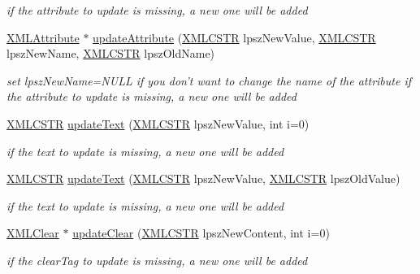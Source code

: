 \begin{DoxyCompactItemize}
\begin{DoxyCompactList}\small\item\em if the attribute to update is missing, a new one will be added \end{DoxyCompactList}\item 
\hyperlink{structXMLAttribute}{X\-M\-L\-Attribute} $\ast$ \hyperlink{group__xmlUpdate_gad334b0726cb7075a16aaca98aaff6372}{update\-Attribute} (\hyperlink{xmlParser_8h_acdb0d6fd8dd596384b438d86cfb2b182}{X\-M\-L\-C\-S\-T\-R} lpsz\-New\-Value, \hyperlink{xmlParser_8h_acdb0d6fd8dd596384b438d86cfb2b182}{X\-M\-L\-C\-S\-T\-R} lpsz\-New\-Name, \hyperlink{xmlParser_8h_acdb0d6fd8dd596384b438d86cfb2b182}{X\-M\-L\-C\-S\-T\-R} lpsz\-Old\-Name)
\begin{DoxyCompactList}\small\item\em set lpsz\-New\-Name=N\-U\-L\-L if you don't want to change the name of the attribute if the attribute to update is missing, a new one will be added \end{DoxyCompactList}\item 
\hyperlink{xmlParser_8h_acdb0d6fd8dd596384b438d86cfb2b182}{X\-M\-L\-C\-S\-T\-R} \hyperlink{group__xmlUpdate_gaad04ffd86ca67253bbc81f941608f8d2}{update\-Text} (\hyperlink{xmlParser_8h_acdb0d6fd8dd596384b438d86cfb2b182}{X\-M\-L\-C\-S\-T\-R} lpsz\-New\-Value, int i=0)
\begin{DoxyCompactList}\small\item\em if the text to update is missing, a new one will be added \end{DoxyCompactList}\item 
\hyperlink{xmlParser_8h_acdb0d6fd8dd596384b438d86cfb2b182}{X\-M\-L\-C\-S\-T\-R} \hyperlink{group__xmlUpdate_ga476a872fa595ea8416d2991ce3bea7a6}{update\-Text} (\hyperlink{xmlParser_8h_acdb0d6fd8dd596384b438d86cfb2b182}{X\-M\-L\-C\-S\-T\-R} lpsz\-New\-Value, \hyperlink{xmlParser_8h_acdb0d6fd8dd596384b438d86cfb2b182}{X\-M\-L\-C\-S\-T\-R} lpsz\-Old\-Value)
\begin{DoxyCompactList}\small\item\em if the text to update is missing, a new one will be added \end{DoxyCompactList}\item 
\hyperlink{structXMLClear}{X\-M\-L\-Clear} $\ast$ \hyperlink{group__xmlUpdate_gafe78ceff29e1853fdef9f9c3ac2605eb}{update\-Clear} (\hyperlink{xmlParser_8h_acdb0d6fd8dd596384b438d86cfb2b182}{X\-M\-L\-C\-S\-T\-R} lpsz\-New\-Content, int i=0)
\begin{DoxyCompactList}\small\item\em if the clear\-Tag to update is missing, a new one will be added \end{DoxyCompactList}\item 

\end{DoxyCompactItemize}
